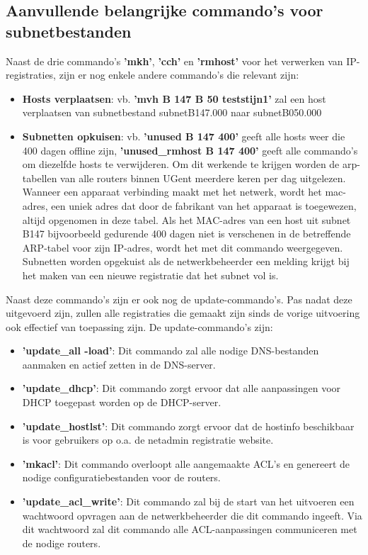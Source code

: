 \subsection{Aanvullende belangrijke commando's voor subnetbestanden}
Naast de drie commando's \textbf{'mkh'}, \textbf{'cch'} en \textbf{'rmhost'} voor het verwerken van IP-registraties, zijn er nog enkele andere commando's die relevant zijn:

\begin{itemize}
    \item \textbf{Hosts verplaatsen}: vb. \textbf{'mvh B 147 B 50 teststijn1'} zal een host verplaatsen van subnetbestand subnetB147.000 naar subnetB050.000 
    \item \textbf{Subnetten opkuisen}: vb. \textbf{'unused B 147 400'} geeft alle hosts weer die 400 dagen offline zijn, \textbf{'unused\_rmhost B 147 400'} geeft alle commando's om diezelfde hosts te verwijderen. Om dit werkende te krijgen worden de \acrshort{arp}-tabellen van alle routers binnen UGent meerdere keren per dag uitgelezen. Wanneer een apparaat verbinding maakt met het netwerk, wordt het \acrfull{mac}-adres, een uniek adres dat door de fabrikant van het apparaat is toegewezen, altijd opgenomen in deze tabel. Als het MAC-adres van een host uit subnet B147 bijvoorbeeld gedurende 400 dagen niet is verschenen in de betreffende ARP-tabel voor zijn IP-adres, wordt het met dit commando weergegeven. Subnetten worden opgekuist als de netwerkbeheerder een melding krijgt bij het maken van een nieuwe registratie dat het subnet vol is.
\end{itemize}

Naast deze commando's zijn er ook nog de update-commando's. Pas nadat deze uitgevoerd zijn, zullen alle registraties die gemaakt zijn sinds de vorige uitvoering ook effectief van toepassing zijn. De update-commando's zijn:

\begin{itemize}
    \item \textbf{'update\_all -load'}: Dit commando zal alle nodige DNS-bestanden aanmaken en actief zetten in de DNS-server.
    \item \textbf{'update\_dhcp'}: Dit commando zorgt ervoor dat alle aanpassingen voor DHCP toegepast worden op de DHCP-server.
    \item \textbf{'update\_hostlst'}: Dit commando zorgt ervoor dat de hostinfo beschikbaar is voor gebruikers op o.a. de netadmin registratie website.
    \item \textbf{'mkacl'}: Dit commando overloopt alle aangemaakte ACL's en genereert de nodige configuratiebestanden voor de routers.
    \item \textbf{'update\_acl\_write'}: Dit commando zal bij de start van het uitvoeren een wachtwoord opvragen aan de netwerkbeheerder die dit commando ingeeft. Via dit wachtwoord zal dit commando alle ACL-aanpassingen communiceren met de nodige routers.
\end{itemize}

